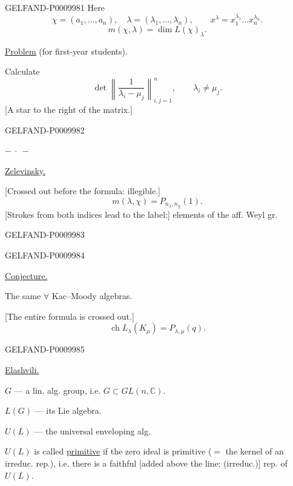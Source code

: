 \begin{GelfandAdjacentEvidence}{GELFAND-P000998}{1}
Here
\[
\chi=(a_1,\ldots,a_n),\quad \lambda=(\lambda_1,\ldots,\lambda_n),
\qquad x^\lambda=x_1^{\lambda_1}\ldots x_n^{\lambda_n}.
\]
\[
m(\chi,\lambda)=\dim L(\chi)_\lambda.
\]

\underline{\underline{Problem}} (for first-year students).

Calculate
\[
\det\left\|\frac{1}{\lambda_i-\mu_j}\right\|_{i,j=1}^{n},
\qquad \lambda_i\ne\mu_j.
\]
[A star to the right of the matrix.]
\end{GelfandAdjacentEvidence}
\begin{GelfandAdjacentEvidence}{GELFAND-P000998}{2}


\begin{center}$-\ \cdot\ -$\end{center}

\underline{Zelevinsky.}

[Crossed out before the formula: illegible.]
\[
m(\lambda,\chi)=P_{n_\lambda,n_\chi}(1).
\]
[Strokes from both indices lead to the label:] elements of the aff. Weyl gr.
\end{GelfandAdjacentEvidence}
\begin{GelfandAdjacentEvidence}{GELFAND-P000998}{3}

\end{GelfandAdjacentEvidence}
\begin{GelfandAdjacentEvidence}{GELFAND-P000998}{4}


\underline{Conjecture.}

The same $\forall$ Kac--Moody algebras.

[The entire formula is crossed out.]
\[
\operatorname{ch}L_\lambda(K_\mu)=P_{\lambda,\mu}(q).
\]
\end{GelfandAdjacentEvidence}
\begin{GelfandAdjacentEvidence}{GELFAND-P000998}{5}


\underline{Elashvili.}

$G$ --- a lin. alg. group, i.e. $G\subset GL(n,\mathbb C)$.

$L(G)$ --- its Lie algebra.

$U(L)$ --- the universal enveloping alg.

$U(L)$ is called \underline{primitive} if the zero ideal is primitive ($=$ the kernel of an irreduc. rep.), i.e. there is a faithful [added above the line: (irreduc.)] rep. of $U(L)$.
\end{GelfandAdjacentEvidence}
